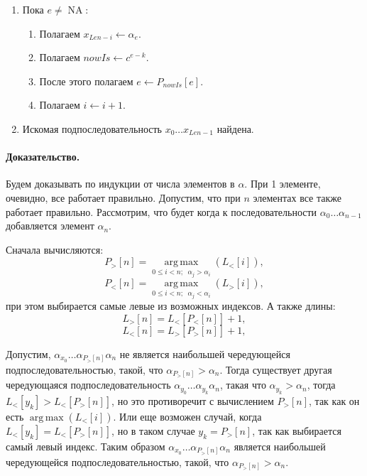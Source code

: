 \documentclass[12pt]{article}
\newcommand{\NA}{\operatorname{NA}}
\begin{document}
\begin{enumerate}
    \item Пока $ e \ne \NA $: 
    \begin{enumerate} 
        \item Полагаем $x_{Len - i} \leftarrow \alpha_e $. 

        \item Полагаем $ nowIs \leftarrow c^{e - k} $.

        \item После этого полагаем $ e \leftarrow P_{nowIs}[e] $.

        \item Полагаем $ i \leftarrow i + 1 $.
    \end{enumerate}
    
    \item Искомая подпоследовательность $ x_0 \dots x_{Len - 1} $ найдена.
    
\end{enumerate}




\paragraph{Доказательство.}
Будем доказывать по индукции от числа элементов в $ \alpha $. При 1 элементе, очевидно, все работает
правильно. Допустим, что при $ n $ элементах все также работает правильно. Рассмотрим, что будет когда
к последовательности $ \alpha_0 \dots \alpha_{n - 1} $ добавляется элемент $ \alpha_n $.

Сначала вычисляются:
$$ P_>[n] = \operatorname*{arg\,max}\limits_{ 0 \le i < n;\;\; \alpha_j > \alpha_i} (L_<[i]), $$ 
$$ P_<[n] = \operatorname*{arg\,max}\limits_{ 0 \le i < n;\;\; \alpha_j < \alpha_i} (L_>[i]), $$ 
при этом выбирается самые левые из возможных индексов. А также длины:
$$ L_>[n] = L_<[P_<[n]] + 1, $$
$$ L_<[n] = L_>[P_>[n]] + 1, $$

Допустим, $ \alpha_{x_0} \dots \alpha_{P_>[n]} \alpha_n $ не является наибольшей чередующейся 
подпоследовательностью, такой, что $ \alpha_{P_>[n]} > \alpha_n $. Тогда существует другая 
чередующаяся подпоследовательность $ \alpha_{y_0} \dots \alpha_{y_k} \alpha_n $, такая что
$ \alpha_{y_k} > \alpha_n $, тогда $ L_<[y_k] > L_<[P_>[n]] $, но это противоречит с вычислением
$ P_>[n] $, так как он есть $ \operatorname*{arg\,max}(L_<[i]) $. Или еще возможен случай,
когда $ L_<[y_k] = L_<[P_>[n]] $, но в таком случае $ y_k = P_>[n] $, так как выбирается
самый левый индекс. Таким образом $ \alpha_{x_0} \dots \alpha_{P_>[n]} \alpha_n $ является
наибольшей чередующейся подпоследовательностью, такой, что $ \alpha_{P_>[n]} > \alpha_n $.
\end{document}
